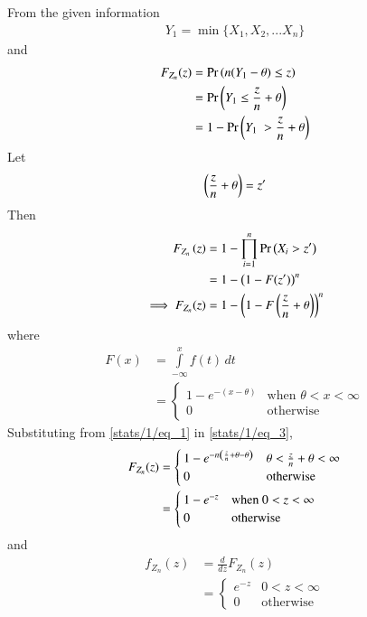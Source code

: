 From the given information
\begin{align}
    Y_1 = \min\{X_1, X_2, ... X_n\}
\end{align}
%
and
\begin{align}
    F_{Z_n}(z) &= \Pr\left(n(Y_1-\theta)\leq z\right)\\
    &= \Pr\left(Y_1\leq \frac{z}{n} +\theta\right)\\
    &= 1-\Pr\left(Y_1\ > \frac{z}{n} +\theta\right)\label{stats/1/eq_2}
\end{align}
%
Let
\begin{align}
    \left(\dfrac{z}{n}+\theta\right) = z^{\prime}
\end{align}
%
Then
\begin{align}
    F_{Z_n}\left(z\right)    &= 1-\prod_{i=1}^{n}\Pr\left(X_i>z^{\prime}\right)\\
    &= 1-\left(1-F(z^{\prime})\right)^n\\
    \implies F_{Z_n}(z) &= 1-\left(1-F\left(\frac{z}{n}+\theta\right)\right)^n\label{stats/1/eq_3}
\end{align}
%
where
%
\begin{align}
  F(x) &=\displaystyle\int\limits_{-\infty}^{x} f(t) \,dt\\
&=
    \begin{cases}
    1-e^{-(x-\theta)} &\text{when }\theta<x<\infty\\
    0 &\text{otherwise}
    \end{cases}
    \label{stats/1/eq_1}
\end{align}
%
Substituting from     \eqref{stats/1/eq_1} in \eqref{stats/1/eq_3},
\begin{align}
    F_{Z_n}(z) &=
    \begin{cases}
    1-e^{-n\left(\frac{z}{n}+\theta-\theta\right)}&  \theta<\frac{z}{n}+\theta<\infty\\
    0&\text{otherwise}
    \end{cases}\\
    &= \begin{cases}
    1-e^{-z}&\text{when } 0<z<\infty\\
    0 &\text{otherwise}\label{stats/1/cdf}
    \end{cases}
\end{align}
and 
\begin{align}
    f_{Z_n}(z) &= \frac{d}{dz}F_{Z_n}(z)\\
    &=\begin{cases}
    e^{-z}& 0<z<\infty\\
    0&\text{otherwise}
    \end{cases}\label{stats/1/pdf}
\end{align}
